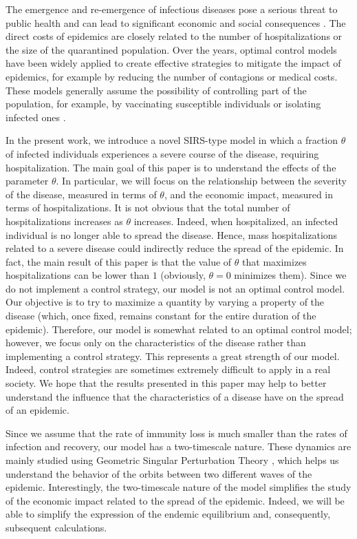 \documentclass[11pt,reqno]{amsart}
\theoremstyle{boldremark}
\begin{document}
The emergence and re-emergence of infectious diseases pose a serious threat to public health and can lead to significant economic and social consequences \cite{6}. The direct costs of epidemics are closely related to the number of hospitalizations or the size of the quarantined population. 
Over the years, optimal control models have been widely applied to create effective strategies to mitigate the impact of epidemics, for example by reducing the number of contagions or medical costs. These models generally assume the possibility of controlling part of the population, for example, by vaccinating susceptible individuals or isolating infected ones \cite{27,22,19,18,21,20, 25, 26}. 

In the present work, we introduce a novel SIRS-type model in which a fraction $\theta$ of infected individuals experiences a severe course of the disease, requiring hospitalization. The main goal of this paper is to understand the effects of the parameter $\theta$. In particular, we will focus on the relationship between the severity of the disease, measured in terms of $\theta$, and the economic impact, measured in terms of hospitalizations. It is not obvious that the total number of hospitalizations increases as $\theta$ increases. Indeed, when hospitalized, an infected individual is no longer able to spread the disease. Hence, mass hospitalizations related to a severe disease could indirectly reduce the spread of the epidemic. In fact, the main result of this paper is that the value of $\theta$ that maximizes hospitalizations can be lower than $1$ (obviously, $\theta=0$ minimizes them). Since we do not implement a control strategy, our model is not an optimal control model. Our objective is to try to maximize a quantity by varying a property of the disease (which, once fixed, remains constant for the entire duration of the epidemic). Therefore, our model is somewhat related to an optimal control model; however, we focus only on the characteristics of the disease rather than implementing a control strategy. This represents a great strength of our model. Indeed, control strategies are sometimes extremely difficult to apply in a real society. We hope that the results presented in this paper may help to better understand the influence that the characteristics of a disease have on the spread of an epidemic. 

Since we assume that the rate of immunity loss is much smaller than the rates of infection and recovery, our model has a two-timescale nature. These dynamics are mainly studied using Geometric Singular Perturbation Theory \cite{23,24,40,0}, which helps us understand the behavior of the orbits between two different waves of the epidemic. Interestingly, the two-timescale nature of the model simplifies the study of the economic impact related to the spread of the epidemic. Indeed, we will be able to simplify the expression of the endemic equilibrium and, consequently, subsequent calculations. 
\end{document}
